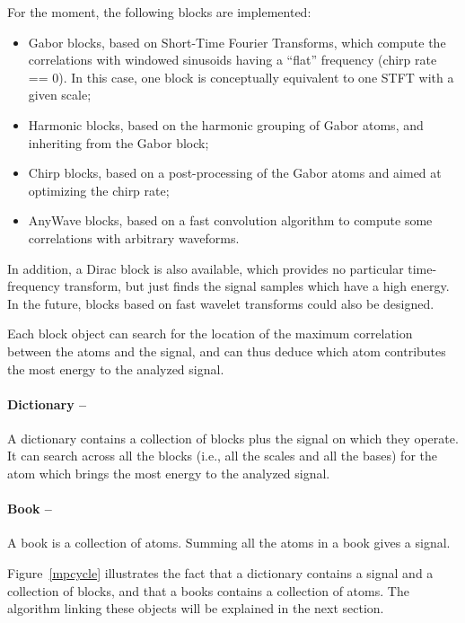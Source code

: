 \documentclass[11pt,a4paper]{article}
\begin{document}
For the moment, the following blocks are implemented:
\begin{itemize}
\item Gabor blocks, based on Short-Time Fourier Transforms, which compute the
  correlations with windowed sinusoids having a ``flat'' frequency (chirp rate
  == 0). In this case, one block is conceptually equivalent to one STFT with a
  given scale;
\item Harmonic blocks, based on the harmonic grouping of Gabor atoms, and
  inheriting from the Gabor block;
\item Chirp blocks, based on a post-processing of the Gabor atoms and aimed at
  optimizing the chirp rate;
\item AnyWave blocks, based on a fast convolution algorithm to compute some
  correlations with arbitrary waveforms.
\end{itemize}
In addition, a Dirac block is also available, which provides no particular
time-frequency transform, but just finds the signal samples which have a high
energy. In the future, blocks based on fast wavelet transforms could also be
designed.

Each block object can search for the location of the maximum correlation
between the atoms and the signal, and can thus deduce which atom contributes
the most energy to the analyzed signal.

\paragraph{Dictionary --} A dictionary contains a collection of blocks plus
the signal on which they operate. It can search across all the blocks (i.e.,
all the scales and all the bases) for the atom which brings the most energy to
the analyzed signal.

\paragraph{Book --} A book is a collection of atoms. Summing all the atoms in
a book gives a signal.

\bigskip

\noindent Figure~\ref{mpcycle} illustrates the fact that a dictionary contains
a signal and a collection of blocks, and that a books contains a collection of
atoms.  The algorithm linking these objects will be explained in the next
section.


\end{document}
